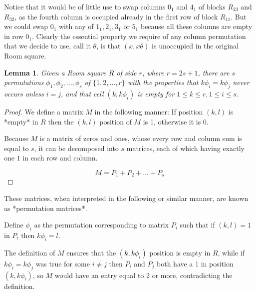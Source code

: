 \documentclass[11pt, a4paper]{book}\usepackage[]{graphicx}\usepackage[]{xcolor}
\newtheorem{lemma}[theorem]{Lemma}
\begin{document}
Notice that it would be of little use to swap columns $0_1$
and $4_1$ of blocks $R_{23}$ and $R_{32}$, as the fourth
column is occupied already in the first row of block
$R_{11}$. But we could swap $0_1$ with any of $1_1,2_1,3_1$
or $5_1$ because all these columns are empty in row $0_1$.
Clearly the essential property we require of any column
permutation that we decide to use, call it $\theta$, is that
$(x,x\theta)$ is unoccupied in the original Room square.

\begin{lemma}
\label{lem:permute}
Given a Room square $R$ of side $r$, where $r=2s+1$, there
are $s$ permutations $\phi_1,\phi_2,...,\phi_s$ of
$\{1,2,...,r\}$ with the properties that $k\phi_i=k\phi_j$
never occurs unless $i=j$, and that cell $(k,k\phi_i)$ is
empty for $1 \leq k \leq r, 1 \leq i\leq s$.
\end{lemma}

\begin{proof}
We define a matrix $M$ in the following manner: If position
$(k,l)$ is *empty* in $R$ then the $(k,l)$ position of $M$
is 1, otherwise it is 0.

Because $M$ is a matrix of zeros and ones, whose every row and
column sum is equal to $s$, it can be decomposed into $s$
matrices, each of which having exactly one $1$ in each row
and column.

\begin{equation}
M = P_1 + P_2 + \ldots + P_s
\end{equation}
\end{proof}

These matrices, when interpreted in the following or similar
manner, are known as *permutation matrices*.

Define $\phi_i$ as the permutation corresponding to matrix
$P_i$ such that if $(k,l) = 1$ in $P_i$ then $k\phi _i = l$.

The definition of $M$ ensures that the $(k, k\phi _i)$
position is empty in $R$, while if $k\phi_{i} = k\phi_{j}$
was true for some $i \neq j$ then $P_i$ and $P_j$ both have
a 1 in position $(k, k\phi_i)$, so $M$ would have an entry
equal to 2 or more, contradicting the definition.
\end{document}
